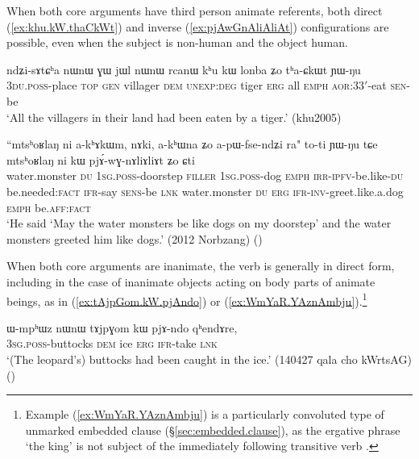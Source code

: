When both core arguments have third person animate referents, both direct (\ref{ex:khu.kW.thaCkWt}) and inverse (\ref{ex:pjAwGnAliAliAt}) configurations are possible, even when the subject is non-human and the object human.

\begin{exe}
\ex \label{ex:khu.kW.thaCkWt}
\gll ndʑi-sɤtɕʰa nɯnɯ ɣɯ jɯl nɯnɯ rcanɯ kʰu kɯ lonba ʑo tʰa-ɕkɯt ɲɯ-ŋu  \\
\textsc{3du}.\textsc{poss}-place \textsc{top} \textsc{gen} villager \textsc{dem} \textsc{unexp}:\textsc{deg} tiger \textsc{erg} all \textsc{emph} \textsc{aor}:\textsc{3}\fl{}3$'$-eat \textsc{sen}-be \\
 \glt `All the villagers in their land had been eaten by a tiger.'  (khu2005)
\end{exe}

\begin{exe}
\ex \label{ex:pjAwGnAliAliAt}
\gll ``mtsʰoʁlaŋ ni a-kʰɤkɯm, nɤki, a-kʰɯna ʑo a-pɯ-fse-ndʑi ra" to-ti ɲɯ-ŋu tɕe mtsʰoʁlaŋ ni kɯ pjɤ́-wɣ-nɤliɤliɤt ʑo ɕti   \\
water.monster \textsc{du} \textsc{1sg}.\textsc{poss}-doorstep \textsc{filler} \textsc{1sg}.\textsc{poss}-dog \textsc{emph} \textsc{irr}-\textsc{ipfv}-be.like-\textsc{du} be.needed:\textsc{fact} \textsc{ifr}-say \textsc{sens}-be \textsc{lnk} water.monster \textsc{du} \textsc{erg} \textsc{ifr}-\textsc{inv}-greet.like.a.dog \textsc{emph} be.\textsc{aff}:\textsc{fact} \\
\glt `He said `May the water monsters be like dogs on my doorstep' and the water monsters greeted him like dogs.' (2012 Norbzang) 	()
\end{exe}

When both core arguments are inanimate, the verb is generally in direct form, including in the case of inanimate objects acting on body parts of animate beings, as in (\ref{ex:tAjpGom.kW.pjAndo}) or (\ref{ex:WmYaR.YAznAmbju}).\footnote{Example (\ref{ex:WmYaR.YAznAmbju}) is a particularly convoluted type of unmarked embedded clause (§\ref{sec:embedded.clause}), as the ergative phrase  `the king' is not subject of the immediately following transitive verb . }

\begin{exe}
\ex \label{ex:tAjpGom.kW.pjAndo}
\gll ɯ-mpʰɯz nɯnɯ tɤjpɣom kɯ pjɤ-ndo qʰendɤre, \\
\textsc{3sg}.\textsc{poss}-buttocks \textsc{dem} ice \textsc{erg} \textsc{ifr}-take \textsc{lnk} \\
\glt `(The leopard's) buttocks had been caught in the ice.' (140427 qala cho kWrtsAG)
()
\end{exe}

